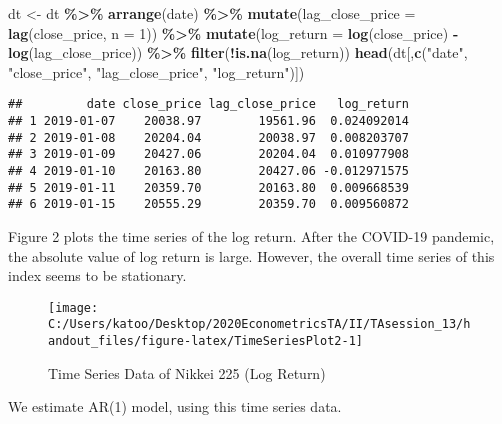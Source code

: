 \documentclass[
  12pt,
]{article}
\newenvironment{Shaded}{\begin{snugshade}}{\end{snugshade}}
\newcommand{\DataTypeTok}[1]{\textcolor[rgb]{0.13,0.29,0.53}{#1}}
\newcommand{\DecValTok}[1]{\textcolor[rgb]{0.00,0.00,0.81}{#1}}
\newcommand{\KeywordTok}[1]{\textcolor[rgb]{0.13,0.29,0.53}{\textbf{#1}}}
\newcommand{\NormalTok}[1]{#1}
\newcommand{\OperatorTok}[1]{\textcolor[rgb]{0.81,0.36,0.00}{\textbf{#1}}}
\newcommand{\StringTok}[1]{\textcolor[rgb]{0.31,0.60,0.02}{#1}}
\begin{document}
\begin{Shaded}
\begin{Highlighting}[]
\NormalTok{dt \textless{}{-}}\StringTok{ }\NormalTok{dt }\OperatorTok{\%\textgreater{}\%}\StringTok{ }
\StringTok{  }\KeywordTok{arrange}\NormalTok{(date) }\OperatorTok{\%\textgreater{}\%}\StringTok{ }
\StringTok{  }\KeywordTok{mutate}\NormalTok{(}\DataTypeTok{lag\_close\_price =} \KeywordTok{lag}\NormalTok{(close\_price, }\DataTypeTok{n =} \DecValTok{1}\NormalTok{)) }\OperatorTok{\%\textgreater{}\%}\StringTok{ }
\StringTok{  }\KeywordTok{mutate}\NormalTok{(}\DataTypeTok{log\_return =} \KeywordTok{log}\NormalTok{(close\_price) }\OperatorTok{{-}}\StringTok{ }\KeywordTok{log}\NormalTok{(lag\_close\_price)) }\OperatorTok{\%\textgreater{}\%}\StringTok{ }
\StringTok{  }\KeywordTok{filter}\NormalTok{(}\OperatorTok{!}\KeywordTok{is.na}\NormalTok{(log\_return))}
\KeywordTok{head}\NormalTok{(dt[,}\KeywordTok{c}\NormalTok{(}\StringTok{"date"}\NormalTok{, }\StringTok{"close\_price"}\NormalTok{, }\StringTok{"lag\_close\_price"}\NormalTok{, }\StringTok{"log\_return"}\NormalTok{)])}
\end{Highlighting}
\end{Shaded}

\begin{verbatim}
##         date close_price lag_close_price   log_return
## 1 2019-01-07    20038.97        19561.96  0.024092014
## 2 2019-01-08    20204.04        20038.97  0.008203707
## 3 2019-01-09    20427.06        20204.04  0.010977908
## 4 2019-01-10    20163.80        20427.06 -0.012971575
## 5 2019-01-11    20359.70        20163.80  0.009668539
## 6 2019-01-15    20555.29        20359.70  0.009560872
\end{verbatim}

Figure 2 plots the time series of the log return. After the COVID-19
pandemic, the absolute value of log return is large. However, the
overall time series of this index seems to be stationary.

\begin{figure}[h]

{\centering \texttt{[image: C:/Users/katoo/Desktop/2020EconometricsTA/II/TAsession\_13/handout\_files/figure-latex/TimeSeriesPlot2-1]} 

}

\caption{Time Series Data of Nikkei 225 (Log Return)}\label{fig:TimeSeriesPlot2}
\end{figure}

We estimate AR(1) model, using this time series data.
\end{document}
